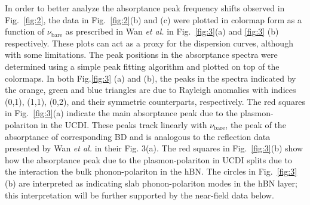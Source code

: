 \documentclass[preprint,
amsmath,amssymb,
aip,
jap,
floatfix,]{revtex4-2}
\begin{document}
			In order to better analyze the absorptance peak frequency shifts observed in Fig.~\ref{fig:2}, the data in Fig.~\ref{fig:2}(b) and (c) were plotted in colormap form as a function of $\nu_\mathrm{bare}$ as prescribed in Wan \textit{et al.} \cite{Wan:16} in Fig.~\ref{fig:3}(a) and \ref{fig:3} (b) respectively. These plots can act as a proxy for the dispersion curves, although with some limitations. The peak positions in the absorptance spectra were determined using a simple peak fitting algorithm \cite{peakfinding} and plotted on top of the colormaps. In both Fig.\ref{fig:3} (a) and (b), the peaks in the spectra indicated by the orange, green and blue triangles are due to Rayleigh anomalies \cite{Wood:1902,Rayleigh:1907,Gao:2009} with indices (0,1), (1,1), (0,2), and their symmetric counterparts, respectively. The red squares in Fig.~\ref{fig:3}(a) indicate the main absorptance peak due to the plasmon-polariton in the UCDI. These peaks track linearly with $\nu_\mathrm{bare}$, the peak of the absorptance of corresponding BD and is analogous to the reflection data presented by Wan \textit{et al.} \cite{Wan:16} in their Fig. 3(a). The red squares in Fig.~\ref{fig:3}(b) show how the absorptance peak due to the plasmon-polariton in UCDI splits due to the interaction the bulk phonon-polariton in the hBN. The circles in Fig.~\ref{fig:3}(b) are interpreted as indicating slab phonon-polariton modes in the hBN layer; this interpretation will be further supported by the near-field data below.
\end{document}
